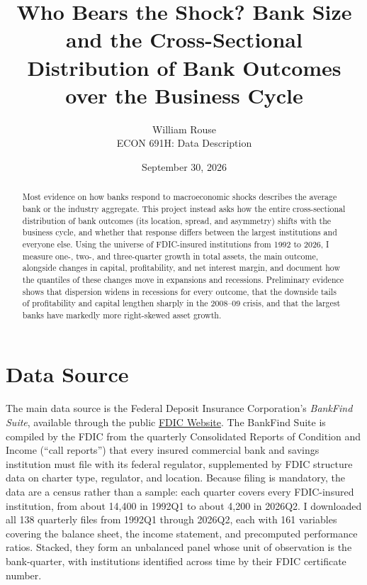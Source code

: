 \documentclass[11pt]{article}
\title{Who Bears the Shock? Bank Size and the Cross-Sectional\\
       Distribution of Bank Outcomes over the Business Cycle}
\author{William Rouse\\ \small ECON 691H: Data Description}
\date{September 30, 2026}
\begin{document}
\maketitle

\begin{abstract}
\noindent
Most evidence on how banks respond to macroeconomic shocks describes the average bank or the industry aggregate. This project instead asks how the entire cross-sectional distribution of bank outcomes (its location, spread, and asymmetry) shifts with the business cycle, and whether that response differs between the largest institutions and everyone else. Using the universe of FDIC-insured institutions from 1992 to 2026, I measure one-, two-, and three-quarter growth in total assets, the main outcome, alongside changes in capital, profitability, and net interest margin, and document how the quantiles of these changes move in expansions and recessions. Preliminary evidence shows that dispersion widens in recessions for every outcome, that the downside tails of profitability and capital lengthen sharply in the 2008--09 crisis, and that the largest banks have markedly more right-skewed asset growth.
\end{abstract}

\section*{Data Source}

The main data source is the Federal Deposit Insurance Corporation's \emph{BankFind Suite}, available through the public \href{https://banks.data.fdic.gov/bankfind-suite/bulkData/bulkDataDownload}{FDIC Website}. The BankFind Suite is compiled by the FDIC from the quarterly Consolidated Reports of Condition and Income (``call reports'') that every insured commercial bank and savings institution must file with its federal regulator, supplemented by FDIC structure data on charter type, regulator, and location. Because filing is mandatory, the data are a census rather than a sample: each quarter covers every FDIC-insured institution, from about 14{,}400 in 1992Q1 to about 4{,}200 in 2026Q2. I downloaded all 138 quarterly files from 1992Q1 through 2026Q2, each with 161 variables covering the balance sheet, the income statement, and precomputed performance ratios. Stacked, they form an unbalanced panel whose unit of observation is the bank-quarter, with institutions identified across time by their FDIC certificate number.
\end{document}
